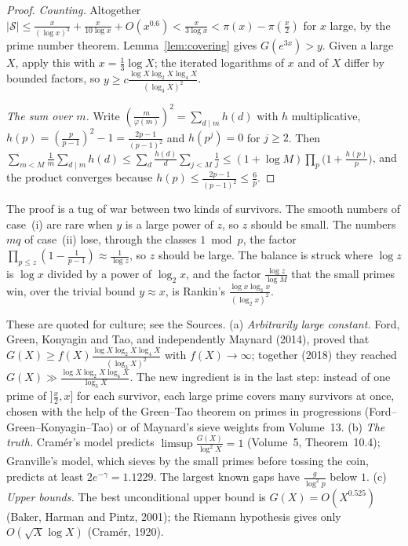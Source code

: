 \begin{proof}
\emph{Counting.} Altogether $|\mathcal S|\le\frac x{(\log x)^3}+\frac x{10\log x}+O(x^{0.6})<\frac x{3\log x}<\pi(x)-\pi(\frac x2)$ for $x$ large, by the prime number theorem. Lemma~\ref{lem:covering} gives $G(e^{3x})>y$. Given a large $X$, apply this with $x=\frac13\log X$; the iterated logarithms of $x$ and of $X$ differ by bounded factors, so $y\ge c\frac{\log X\log_2X\log_4X}{(\log_3X)^2}$.

\emph{The sum over $m$.} Write $(\frac m{\varphi(m)})^2=\sum_{d\mid m}h(d)$ with $h$ multiplicative, $h(p)=(\frac p{p-1})^2-1=\frac{2p-1}{(p-1)^2}$ and $h(p^j)=0$ for $j\ge2$. Then $\sum_{m<M}\frac1m\sum_{d\mid m}h(d)\le\sum_d\frac{h(d)}d\sum_{j<M}\frac1j\le(1+\log M)\prod_p\bigl(1+\frac{h(p)}p\bigr)$, and the product converges because $h(p)\le\frac{2p-1}{(p-1)^2}\le\frac 6p$.
\end{proof}

The proof is a tug of war between two kinds of survivors. The smooth numbers of case~(i) are rare when $y$ is a large power of $z$, so $z$ should be small. The numbers $mq$ of case~(ii) lose, through the classes $1\bmod p$, the factor $\prod_{p\le z}(1-\frac1{p-1})\approx\frac{1}{\log z}$, so $z$ should be large. The balance is struck where $\log z$ is $\log x$ divided by a power of $\log_2x$, and the factor $\frac{\log z}{\log M}$ that the small primes win, over the trivial bound $y\approx x$, is Rankin's $\frac{\log x\log_3x}{(\log_2x)^2}$.

\begin{remark}
These are quoted for culture; see the Sources. (a) \emph{Arbitrarily large constant.} Ford, Green, Konyagin and Tao, and independently Maynard (2014), proved that $G(X)\ge f(X)\frac{\log X\log_2X\log_4X}{(\log_3X)^2}$ with $f(X)\to\infty$; together (2018) they reached $G(X)\gg\frac{\log X\log_2X\log_4X}{\log_3X}$. The new ingredient is in the last step: instead of one prime of $]\frac x2,x]$ for each survivor, each large prime covers many survivors at once, chosen with the help of the Green--Tao theorem on primes in progressions (Ford--Green--Konyagin--Tao) or of Maynard's sieve weights from Volume~13. (b) \emph{The truth.} Cramér's model predicts $\limsup\frac{G(X)}{\log^2X}=1$ (Volume~5, Theorem~10.4); Granville's model, which sieves by the small primes before tossing the coin, predicts at least $2e^{-\gamma}=1.1229$. The largest known gaps have $\frac{g}{\log^2p}$ below $1$. (c) \emph{Upper bounds.} The best unconditional upper bound is $G(X)=O(X^{0.525})$ (Baker, Harman and Pintz, 2001); the Riemann hypothesis gives only $O(\sqrt X\log X)$ (Cramér, 1920).
\end{remark}

